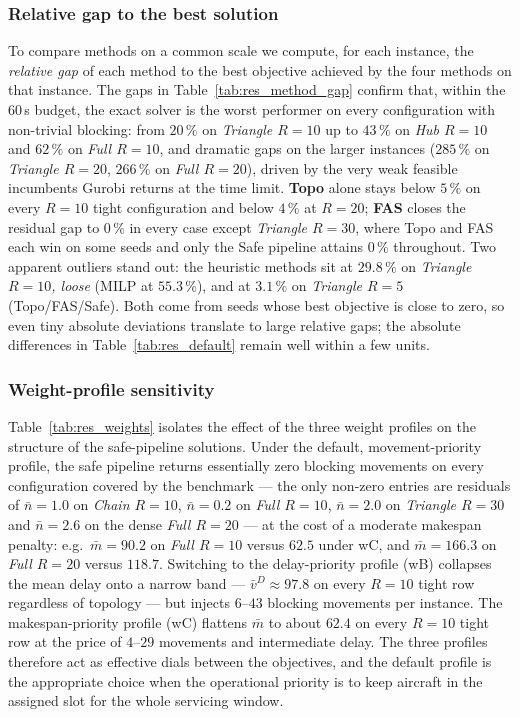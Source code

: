 

\subsubsection{Relative gap to the best solution}

To compare methods on a common scale we compute, for each instance, the
\emph{relative gap} of each method to the best objective achieved by the
four methods on that instance.  The gaps in
Table~\ref{tab:res_method_gap} confirm that, within the 60\,s budget,
the exact solver is the worst performer on every configuration with
non-trivial blocking: from $20\,\%$ on \emph{Triangle $R{=}10$} up to
$43\,\%$ on \emph{Hub $R{=}10$} and $62\,\%$ on \emph{Full $R{=}10$},
and dramatic gaps on the larger instances ($285\,\%$ on
\emph{Triangle $R{=}20$}, $266\,\%$ on \emph{Full $R{=}20$}), driven by
the very weak feasible incumbents Gurobi returns at the time limit.
\textbf{Topo} alone stays below $5\,\%$ on every $R{=}10$ tight
configuration and below $4\,\%$ at $R{=}20$; \textbf{FAS} closes the
residual gap to $0\,\%$ in every case except \emph{Triangle $R{=}30$},
where Topo and FAS each win on some seeds and only the Safe pipeline
attains $0\,\%$ throughout.  Two apparent outliers stand out: the heuristic methods sit at
$29.8\,\%$ on \emph{Triangle $R{=}10$, loose} (MILP at $55.3\,\%$),
and at $3.1\,\%$ on \emph{Triangle $R{=}5$} (Topo/FAS/Safe).  Both come from
seeds whose best objective is close to zero, so even tiny absolute
deviations translate to large relative gaps; the absolute differences
in Table~\ref{tab:res_default} remain well within a few units.



\subsubsection{Weight-profile sensitivity}

Table~\ref{tab:res_weights} isolates the effect of the three weight
profiles on the structure of the safe-pipeline solutions.  Under the
default, movement-priority profile, the safe pipeline returns
essentially zero blocking movements on every configuration covered by
the benchmark --- the only non-zero entries are residuals of
$\bar n{=}1.0$ on \emph{Chain $R{=}10$}, $\bar n{=}0.2$ on
\emph{Full $R{=}10$}, $\bar n{=}2.0$ on \emph{Triangle $R{=}30$} and
$\bar n{=}2.6$ on the dense \emph{Full $R{=}20$} --- at the cost of a
moderate makespan penalty: e.g.\ $\bar m{=}90.2$ on
\emph{Full $R{=}10$} versus $62.5$ under wC, and $\bar m{=}166.3$ on
\emph{Full $R{=}20$} versus $118.7$.  Switching to the delay-priority
profile (wB) collapses the mean delay onto a narrow band ---
$\bar v^D \approx 97.8$ on every $R{=}10$ tight row regardless of
topology --- but injects $6$--$43$ blocking movements per instance.
The makespan-priority profile (wC) flattens $\bar m$ to about
$62.4$ on every $R{=}10$ tight row at the price of
$4$--$29$ movements and intermediate delay.  The three profiles
therefore act as effective dials between the objectives, and the
default profile is the appropriate choice when the operational
priority is to keep aircraft in the assigned slot for the whole
servicing window.



\FloatBarrier
